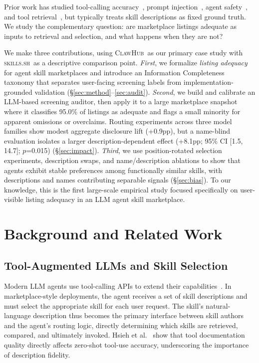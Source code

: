 \documentclass[11pt]{article}
\newcommand{\clawhub}{\textsc{ClawHub}\xspace}
\newcommand{\skillssh}{\textsc{skills.sh}\xspace}
\begin{document}
Prior work has studied tool-calling
accuracy~\cite{schick2023toolformer},
prompt injection~\cite{greshake2023indirect},
agent safety~\cite{debenedetti2024agentdojo},
and tool retrieval~\cite{shi2025toolretrieval},
but typically treats skill descriptions as fixed
ground truth.
We study the complementary question: are marketplace
listings adequate as inputs to retrieval and selection,
and what happens when they are not?

We make three contributions, using \clawhub\ as our
primary case study with \skillssh\ as a descriptive
comparison point.
\emph{First}, we formalize \emph{listing adequacy}
for agent skill marketplaces and introduce an
Information Completeness taxonomy that separates
user-facing screening labels from implementation-grounded
validation
(\S\ref{sec:method}--\ref{sec:audit}).
\emph{Second}, we build and calibrate an LLM-based
screening auditor, then apply it to a large marketplace
snapshot where it classifies 95.0\% of listings as
adequate and flags a small minority for apparent
omissions or overclaims. Routing experiments across
three model families show modest aggregate disclosure
lift (+0.9pp), but a name-blind evaluation isolates a
larger description-dependent effect (+8.1pp; 95\% CI
[1.5, 14.7]; $p$=0.015)
(\S\ref{sec:impact}).
\emph{Third}, we use position-rotated selection
experiments, description swaps, and name/description
ablations to show that agents exhibit stable preferences
among functionally similar skills, with descriptions and
names contributing separable signals
(\S\ref{sec:bias}).
To our knowledge, this is the first large-scale
empirical study focused specifically on user-visible
listing adequacy in an LLM agent skill marketplace.

\section{Background and Related Work}
\label{sec:background}

\subsection{Tool-Augmented LLMs and Skill Selection}
\label{subsec:tool_llm}

Modern LLM agents use tool-calling APIs to extend their
capabilities~\cite{schick2023toolformer, qin2023toolllm,
patil2023gorilla}.
In marketplace-style deployments, the agent receives a set of
skill descriptions and must select the appropriate skill for each
user request.
The skill's natural-language description thus becomes the
primary interface between skill authors and the agent's routing
logic, directly determining which skills are retrieved,
compared, and ultimately invoked.
Hsieh et al.~\cite{hsieh2023tool} show that tool documentation
quality directly affects zero-shot tool-use accuracy,
underscoring the importance of description fidelity.
\end{document}
